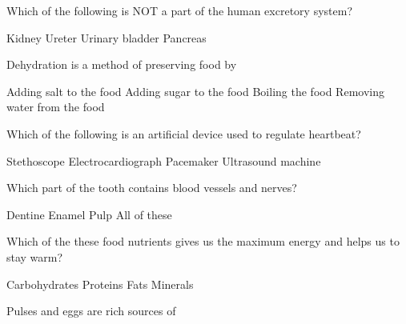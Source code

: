 \documentclass[a4paper]{exam}
\begin{document}
\begin{center}
\end{center}

\vspace{5mm}

\vspace{5mm}

\begin{questions}
\question Which of the following is NOT a part of the human excretory system?

\begin{oneparchoices}
    \choice Kidney
    \choice Ureter
    \choice Urinary bladder
    \choice Pancreas
\end{oneparchoices}

\question Dehydration is a method of preserving food by \hrulefill

\begin{oneparchoices}
    \choice Adding salt to the food
    \choice Adding sugar to the food
    \newline
    \choice Boiling the food
    \choice Removing water from the food
\end{oneparchoices}

\question Which of the following is an artificial device used to regulate heartbeat?

\begin{oneparchoices}
    \choice Stethoscope
    \choice Electrocardiograph
    \choice Pacemaker
    \choice Ultrasound machine
\end{oneparchoices}

\question Which part of the tooth contains blood vessels and nerves?

\begin{oneparchoices}
    \choice Dentine
    \choice Enamel
    \choice Pulp
    \choice All of these
\end{oneparchoices}

\question Which of the these food nutrients gives us the maximum energy and helps us to stay warm?

\begin{oneparchoices}
    \choice Carbohydrates
    \choice Proteins
    \choice Fats
    \choice Minerals
\end{oneparchoices}

\question Pulses and eggs are rich sources of \hrulefill


\end{questions}
\end{document}
